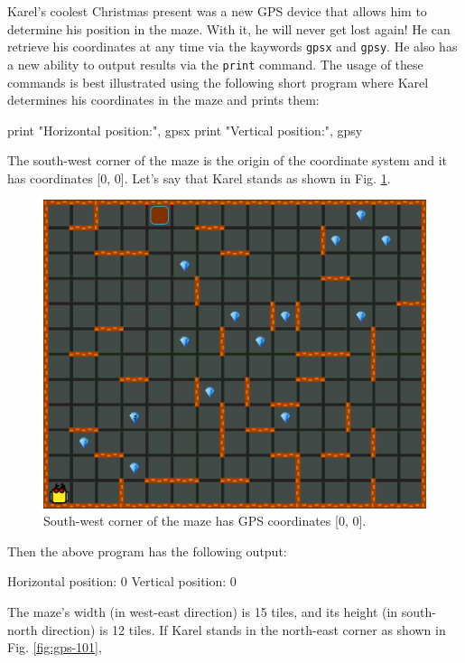 Karel's coolest Christmas present was a new GPS device that allows him to determine his position 
in the maze. With it, he will never get lost again! He can retrieve his coordinates at any time via the 
kaywords {\tt gpsx} and {\tt gpsy}. He also has a new ability to output results via the {\tt print} 
command. The usage of these commands is best illustrated using the following short program where 
Karel determines his coordinates in the maze and prints them:

\begin{bluecode}
print "Horizontal position:", gpsx
print "Vertical position:", gpsy
\end{bluecode}
The south-west corner of the maze is the origin of the coordinate system and it has 
coordinates [0, 0]. Let's say that Karel stands as shown in Fig. \ref{fig:gps-100}.

\begin{figure}[!ht]
\begin{center}
\includegraphics[height=0.4\textwidth]{imgk/gps-100.png}
\vspace{-0mm}
\caption{South-west corner of the maze has GPS coordinates [0, 0].}
\label{fig:gps-100}
\end{center}
\end{figure}
\noindent
Then the above program has the following output:

\begin{bluecode}
Horizontal position: 0
Vertical position: 0
\end{bluecode}
The maze's width (in west-east direction) is 15 tiles, and its height (in south-north direction) 
is 12 tiles. If Karel stands in the north-east corner as shown in Fig. \ref{fig:gps-101},

